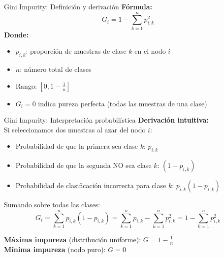 \documentclass[aspectratio=169,12pt]{beamer}
\begin{document}
\begin{frame}{Gini Impurity: Definición y derivación}
  \large
  \textbf{Fórmula:}
  \[ G_i = 1 - \sum_{k=1}^{n} p_{i,k}^2 \]
  \textbf{Donde:}
  \begin{itemize}
    \item $p_{i,k}$: proporción de muestras de clase $k$ en el nodo $i$
    \item $n$: número total de clases
    \item Rango: $[0, 1 - \frac{1}{n}]$
    \item $G_i = 0$ indica pureza perfecta (todas las muestras de una clase)
  \end{itemize}
\end{frame}

\begin{frame}{Gini Impurity: Interpretación probabilística}
  \textbf{Derivación intuitiva:}\\
  Si seleccionamos dos muestras al azar del nodo $i$:
  \begin{itemize}
    \item Probabilidad de que la primera sea clase $k$: $p_{i,k}$
    \item Probabilidad de que la segunda NO sea clase $k$: $(1 - p_{i,k})$
    \item Probabilidad de clasificación incorrecta para clase $k$: $p_{i,k}(1 - p_{i,k})$
  \end{itemize}
  Sumando sobre todas las clases:
  \[
    G_i = \sum_{k=1}^{n} p_{i,k}(1 - p_{i,k}) = \sum_{k=1}^{n} p_{i,k} - \sum_{k=1}^{n} p_{i,k}^2 = 1 - \sum_{k=1}^{n} p_{i,k}^2
  \]
  \begin{goldbox}
    \textbf{Máxima impureza} (distribución uniforme): $G = 1 - \frac{1}{n}$\\
    \textbf{Mínima impureza} (nodo puro): $G = 0$
  \end{goldbox}
\end{frame}
\end{document}
